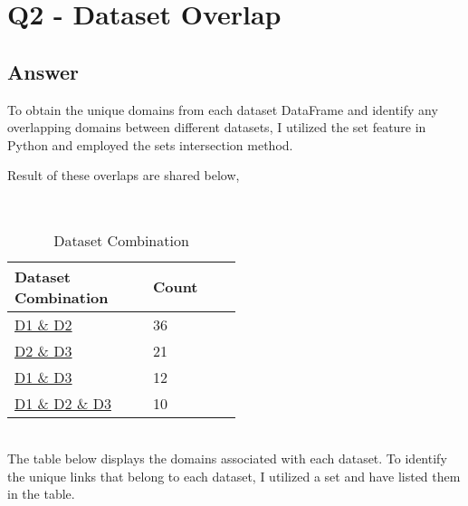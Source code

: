\documentclass[12pt]{article}
\begin{document}
\clearpage

\section*{Q2 - Dataset Overlap}

\subsection*{Answer}
To obtain the unique domains from each dataset DataFrame and identify any overlapping domains between different datasets, I utilized the set feature in Python and employed the sets intersection method.

Result of these overlaps are shared below, 

\\
\begin{table}[h]
\centering
\caption{Dataset Combination}
\label{tbl:simple}
\begin{tabular}{p{0.25\linewidth}p{0.25\linewidth}}
\hline
\textbf{Dataset Combination} & \textbf{Count}  \\ \hline \hline
\url{D1 & D2 } & 36 \\ \hline
\url{D2 & D3 } & 21 \\ \hline
\url{D1 & D3 } & 12 \\ \hline
\url{D1 & D2 & D3} & 10  \\ \hline \hline

\end{tabular}
\end{table}
\\
The table below displays the domains associated with each dataset. To identify the unique links that belong to each dataset, I utilized a set and have listed them in the table.
\end{document}
